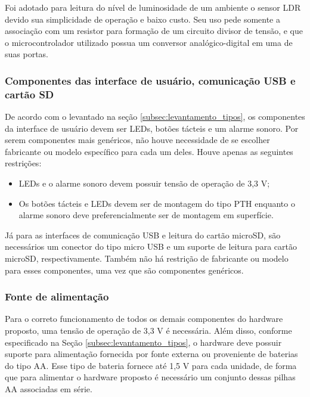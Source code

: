Foi adotado para leitura do nível de luminosidade de um ambiente o sensor \gls{LDR} devido sua simplicidade de operação e baixo custo. Seu uso pede somente a associação com um resistor para formação de um circuito divisor de tensão, e que o microcontrolador utilizado possua um conversor analógico-digital em uma de suas portas. 





\subsubsection{Componentes das interface de usuário, comunicação USB e cartão SD}

De acordo com o levantado na seção \ref{subsec:levantamento_tipos}, os componentes da interface de usuário devem ser LEDs, botões tácteis e um alarme sonoro. Por serem componentes mais genéricos, não houve necessidade de se escolher fabricante ou modelo específico para cada um deles. Houve apenas as seguintes restrições: 

\begin{itemize}
    \item LEDs e o alarme sonoro devem possuir tensão de operação de 3,3 V;
    \item Os botões tácteis e LEDs devem ser de montagem do tipo PTH enquanto o alarme sonoro deve preferencialmente ser de montagem em superfície.
\end{itemize}

Já para as interfaces de comunicação USB e leitura do cartão microSD, são necessários um conector do tipo micro USB e um suporte de leitura para cartão microSD, respectivamente. Também não há restrição de fabricante ou modelo para esses componentes, uma vez que são componentes genéricos. 


\subsubsection{Fonte de alimentação}\label{subsubsec:fonte_alimentacao}

Para o correto funcionamento de todos os demais componentes do hardware proposto, uma tensão de operação de 3,3 V é necessária. Além disso, conforme especificado na Seção \ref{subsec:levantamento_tipos}, o hardware deve possuir suporte para alimentação fornecida por fonte externa ou proveniente de baterias do tipo AA. Esse tipo de bateria fornece até 1,5 V para cada unidade, de forma que para alimentar o hardware proposto é necessário um conjunto dessas pilhas AA associadas em série.

